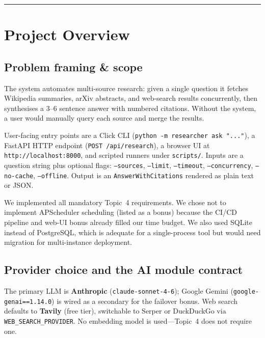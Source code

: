 \documentclass[11pt,a4paper]{article}
\begin{document}
\tableofcontents
\vspace{0.6em}\hrule\vspace{0.4em}

\section{Project Overview}

\subsection{Problem framing \& scope}

The system automates multi-source research: given a single question it fetches Wikipedia summaries, arXiv abstracts, and web-search results concurrently, then synthesises a 3--6 sentence answer with numbered citations. Without the system, a user would manually query each source and merge the results.

User-facing entry points are a Click CLI (\texttt{python -m researcher ask "..."}), a FastAPI HTTP endpoint (\texttt{POST /api/research}), a browser UI at \texttt{http://localhost:8000}, and scripted runners under \texttt{scripts/}. Inputs are a question string plus optional flags: \texttt{--sources}, \texttt{--limit}, \texttt{--timeout}, \texttt{--concurrency}, \texttt{--no-cache}, \texttt{--offline}. Output is an \texttt{AnswerWithCitations} rendered as plain text or JSON.

We implemented all mandatory Topic~4 requirements. We chose not to implement APScheduler scheduling (listed as a bonus) because the CI/CD pipeline and web-UI bonus already filled our time budget. We also used SQLite instead of PostgreSQL, which is adequate for a single-process tool but would need migration for multi-instance deployment.

\subsection{Provider choice and the AI module contract}

The primary LLM is \textbf{Anthropic} (\texttt{claude-sonnet-4-6}); Google Gemini (\texttt{google-genai==1.14.0}) is wired as a secondary for the failover bonus. Web search defaults to \textbf{Tavily} (free tier), switchable to Serper or DuckDuckGo via \texttt{WEB\_SEARCH\_PROVIDER}. No embedding model is used---Topic~4 does not require one.
\end{document}
